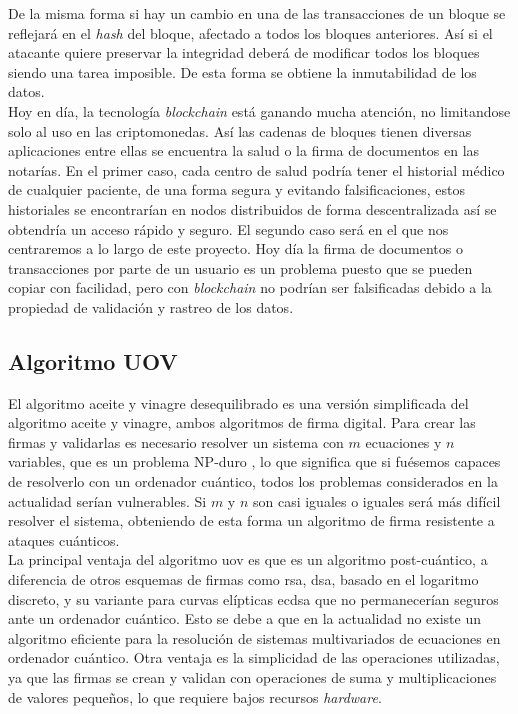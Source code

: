 De la misma forma si hay un cambio en una de las transacciones de un bloque se reflejará en el \textit{hash} del bloque, afectado a todos los bloques anteriores. Así si el atacante quiere preservar la integridad deberá de modificar todos los bloques siendo una tarea imposible. De esta forma se obtiene la inmutabilidad de los datos.\\

Hoy en día, la tecnología \textit{blockchain} está ganando mucha atención, no limitandose solo al uso en las criptomonedas. Así las cadenas de bloques tienen diversas aplicaciones entre ellas se encuentra la salud o la firma de documentos en las notarías. En el primer caso, cada centro  de salud podría tener el historial médico de cualquier paciente, de una forma segura y evitando falsificaciones, estos historiales se encontrarían en nodos distribuidos de forma descentralizada así se obtendría un acceso rápido y seguro. El segundo caso será en el que nos centraremos a lo largo de este proyecto. Hoy día la firma de documentos o transacciones por parte de un usuario es un problema puesto que se pueden copiar con facilidad, pero con \textit{blockchain} no podrían ser falsificadas debido a la propiedad de validación y rastreo de los datos.\\


\subsection{Algoritmo UOV}\label{sec:intro:UOV}

El algoritmo aceite y vinagre desequilibrado es una versión simplificada del algoritmo aceite y vinagre, ambos algoritmos de firma digital. Para crear las firmas y validarlas es necesario resolver un sistema con $m$ ecuaciones y $n$ variables, que es un problema NP-duro \cite{wiki-UOV}, lo que significa que si fuésemos capaces de resolverlo con un ordenador cuántico, todos los problemas considerados en la actualidad serían vulnerables. Si $m$ y $n$ son casi iguales o iguales será más difícil resolver el sistema, obteniendo de esta forma un algoritmo de firma resistente a ataques cuánticos.\\

La principal ventaja del algoritmo \acrshort{uov} es que es un algoritmo post-cuántico, a diferencia de otros esquemas de firmas como \acrshort{rsa}, \acrshort{dsa}, basado en el logaritmo discreto, y su variante para curvas elípticas \mbox{\acrshort{ecdsa}} que no permanecerían seguros ante un ordenador cuántico. Esto se debe a que en la actualidad no existe un algoritmo eficiente para la resolución de sistemas multivariados de ecuaciones  en ordenador cuántico. Otra ventaja es la simplicidad de las operaciones utilizadas, ya que las firmas se crean y validan con operaciones de suma y multiplicaciones de valores pequeños, lo que requiere bajos recursos \textit{hardware}. 

